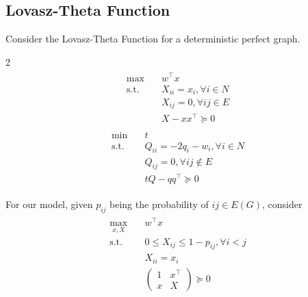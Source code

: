 \documentclass{article}
\newcommand{\R}{\mathbb{R}}
\newcommand{\symm}{\mathbb{S}}
\renewcommand{\symm}{\mathbb{S}}
\begin{document}
\subsection{Lovasz-Theta Function}
Consider the Lovasz-Theta Function for a deterministic perfect graph.
\begin{multicols}{2}
    \noindent
    \begin{align}
\label{SDP-P}
\tag{SDP-P}
\begin{split}
    \max\quad &w^\top x\\
    \text{s.t.}\quad &X_{ii}=x_i, \forall i\in N\\
    &X_{ij}=0,\forall ij\in E\\
    &X-xx^\top\succeq 0
\end{split}
\end{align}
\columnbreak
\begin{align}
\label{SDP-D}
\tag{SDP-D}
\begin{split}
    \min\quad &t\\
    \text{s.t.}\quad
    &Q_{ii}=-2q_i-w_i,\forall i \in N\\
    &Q_{ij}=0,\forall ij\notin E\\
    &tQ-qq^\top\succeq 0
\end{split}
\end{align}
\end{multicols}
For our model, given $p_{ij}$ being the probability of $ij\in E(G)$, consider
\begin{align}
  \label{SDP-P'}
  \tag{SDP-P'}
  \begin{split}
    \max_{x,X}\quad &w^\top x\\
    \text{s.t.}\quad &0\leq X_{ij}\leq 1-p_{ij},\forall i<j\\
    &X_{ii}=x_i\\
    &
    \begin{pmatrix}
      1&x^\top\\
      x&X
    \end{pmatrix}\succeq 0
  \end{split}
\end{align}
\end{document}
